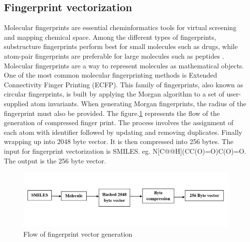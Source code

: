 \documentclass[conference]{IEEEtran}
\begin{document}
\subsection{Fingerprint vectorization}

Molecular fingerprints are essential cheminformatics tools for virtual screening and mapping chemical space. Among the different types of fingerprints, substructure fingerprints perform best for small molecules such as drugs, while atom-pair fingerprints are preferable for large molecules such as peptides \cite{b18}. Molecular fingerprints are a way to represent molecules as mathematical objects. One of the most common molecular fingerprinting methods is Extended Connectivity Finger Printing (ECFP). This family of fingerprints, also known as circular fingerprints, is built by applying the Morgan algorithm to a set of user-supplied atom invariants. When generating Morgan fingerprints, the radius of the fingerprint must also be provided. The figure.\ref{f2} represents the flow of the generation of compressed finger print. The process involves the assignment of each atom with identifier followed by updating and removing duplicates. Finally wrapping up into 2048 byte vector. It is then compressed into 256 bytes. The input for fingerprint vectorization is SMILES. eg. N[C@@H](CC(O)=O)C(O)=O. The output is the 256 byte vector.

\begin{figure}[htbp]
\centerline{\includegraphics[scale=0.27]{figures/fig2.png}}
\caption{Flow of fingerprint vector generation}
\label{f2}
\end{figure}
\end{document}
